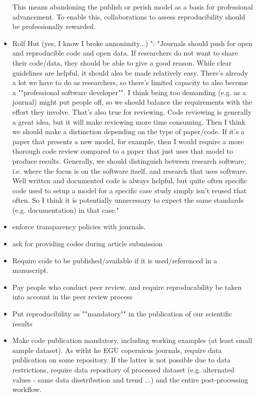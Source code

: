 \documentclass{article}
\begin{document}
\begin{itemize}
This means abandoning the publish or perish model as a basis for professional advancement.
To enable this, collaborations to assess reproducibility should be professionally rewarded.
	\item Rolf Hut (yes, I know I broke annonimity...) ":
"Journals should push for open and reproducible code and open data. If researchers do not want to share their code/data, they should be able to give a good reason.
While clear guidelines are helpful, it should also be made relatively easy. There's already a lot we have to do as researchers, so there's limited capacity to also become a ""professional software developer"". I think being too demanding (e.g. as a journal) might put people off, so we should balance the requirements with the effort they involve. That's also true for reviewing. Code reviewing is generally a great idea, but it will make reviewing more time consuming. 
Then I think we should make a distinction depending on the type of paper/code. If it's a paper that presents a new model, for example, then I would require a more thorough code review compared to a paper that just uses that model to produce results. Generally, we should distinguish between research software, i.e. where the focus is on the software itself, and research that uses software. Well written and documented code is always helpful, but quite often specific code used to setup a model for a specific case study simply isn't reused that often. So I think it is potentially unnecessary to expect the same standards (e.g. documentation) in that case."
	\item enforce transparency policies with journals.
	\item ask for providing codes during article submission
	\item Require code to be published/available if it is used/referenced in a manuscript.
	\item Pay people who conduct peer review, and require reproducability be taken into account in the peer review process
	\item Put reproducibility as ""mandatory"" in the publication of our scientific results
	\item Make code publication mandatory, including working examples (at least small sample dataset). As witht he EGU copernicus journals, require data publication on some repository. If the latter is not possible due to data restrictions, require data repository of processed dataset (e.g. alternated values - same data disstribution and trend ...) and the entire post-processing workflow.

\end{itemize}
\end{document}
